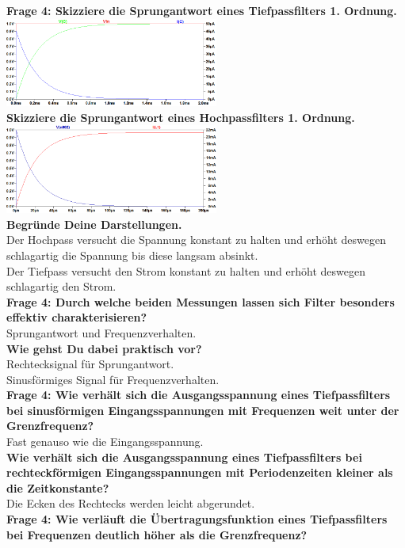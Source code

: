\documentclass[11pt,a4paper]{scrartcl}
\begin{document}
\textbf{Frage 4: Skizziere die Sprungantwort eines Tiefpassfilters 1. Ordnung.}\\
\includegraphics[width=7cm]{sprung_tiefpass.png}\\
\textbf{Skizziere die Sprungantwort eines Hochpassfilters 1. Ordnung.}\\
\includegraphics[width=7cm]{sprung_hochpass.png}\\
\textbf{Begründe Deine Darstellungen.}\\
Der Hochpass versucht die Spannung konstant zu halten und erhöht deswegen schlagartig die Spannung bis diese langsam absinkt.\\
Der Tiefpass versucht den Strom konstant zu halten und erhöht deswegen schlagartig den Strom.\\
\textbf{Frage 4: Durch welche beiden Messungen lassen sich Filter besonders effektiv charakterisieren?}\\
Sprungantwort und Frequenzverhalten.\\
\textbf{Wie gehst Du dabei praktisch vor?}\\
Rechtecksignal für Sprungantwort.\\
Sinusförmiges Signal für Frequenzverhalten.\\
\textbf{Frage 4: Wie verhält sich die Ausgangsspannung eines Tiefpassfilters bei sinusförmigen Eingangsspannungen mit Frequenzen weit unter der Grenzfrequenz?}\\
Fast genauso wie die Eingangsspannung.\\
\textbf{Wie verhält sich die Ausgangsspannung eines Tiefpassfilters bei rechteckförmigen Eingangsspannungen mit Periodenzeiten kleiner als die Zeitkonstante?}\\
Die Ecken des Rechtecks werden leicht abgerundet.\\
\textbf{Frage 4: Wie verläuft die Übertragungsfunktion eines Tiefpassfilters bei Frequenzen deutlich höher als die Grenzfrequenz?}\\
\end{document}
